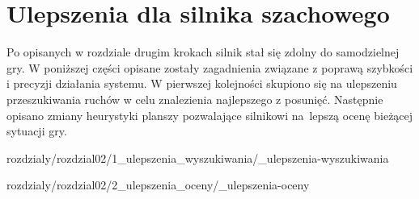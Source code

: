 \chapter{Ulepszenia dla silnika szachowego}
\label{ch:ulepszenia-dla-silnika-szachowego}

Po opisanych w rozdziale drugim krokach silnik stał się zdolny do samodzielnej gry.
W poniższej części opisane zostały zagadnienia związane z poprawą szybkości i precyzji działania systemu.
W pierwszej kolejności skupiono się na ulepszeniu przeszukiwania ruchów w celu znalezienia najlepszego z posunięć.
Następnie opisano zmiany heurystyki planszy pozwalające silnikowi na~lepszą ocenę bieżącej sytuacji gry.

 {rozdzialy/rozdzial02/1_ulepszenia_wyszukiwania/_ulepszenia-wyszukiwania}

 {rozdzialy/rozdzial02/2_ulepszenia_oceny/_ulepszenia-oceny}

